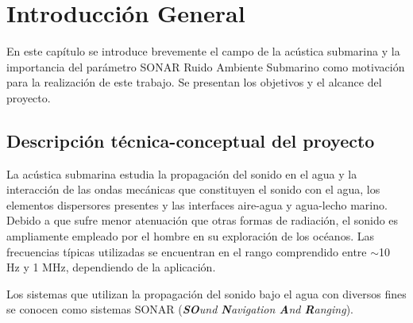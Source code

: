 
\chapter{Introducción General} %

\label{Chapter1} %
\label{IntroGeneral}


\newcommand{\keyword}[1]{\textbf{#1}}
\newcommand{\tabhead}[1]{\textbf{#1}}
\newcommand{\code}[1]{\texttt{#1}}
\newcommand{\file}[1]{\texttt{\bfseries#1}}
\newcommand{\option}[1]{\texttt{\itshape#1}}
\newcommand{\grados}{$^{\circ}$}


En este capítulo se introduce brevemente el campo de la acústica submarina y la importancia del parámetro SONAR Ruido Ambiente Submarino como motivación para la realización de este trabajo.  Se presentan los objetivos y el alcance del proyecto.
\section{Descripción técnica-conceptual del proyecto}


La acústica submarina estudia la propagación del sonido en el agua y la interacción de las ondas mecánicas que constituyen el sonido con el agua, los elementos dispersores presentes y las interfaces aire-agua y agua-lecho marino.  Debido a que sufre menor atenuación que otras formas de radiación, el sonido es ampliamente empleado  por el hombre en su exploración de los océanos.  Las frecuencias típicas utilizadas se encuentran en el rango comprendido entre $\sim$10 Hz y 1 MHz, dependiendo de la aplicación.  

Los sistemas que utilizan la propagación del sonido bajo el agua con diversos fines se conocen como sistemas SONAR (\textit{\textbf{SO}und \textbf{N}avigation \textbf{A}nd \textbf{R}anging}).

